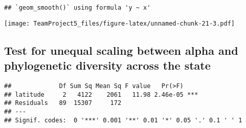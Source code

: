 \documentclass[
]{article}
\newenvironment{Shaded}{\begin{snugshade}}{\end{snugshade}}
\newcommand{\CommentTok}[1]{\textcolor[rgb]{0.56,0.35,0.01}{\textit{#1}}}
\newcommand{\DataTypeTok}[1]{\textcolor[rgb]{0.13,0.29,0.53}{#1}}
\newcommand{\KeywordTok}[1]{\textcolor[rgb]{0.13,0.29,0.53}{\textbf{#1}}}
\newcommand{\NormalTok}[1]{#1}
\newcommand{\OperatorTok}[1]{\textcolor[rgb]{0.81,0.36,0.00}{\textbf{#1}}}
\newcommand{\OtherTok}[1]{\textcolor[rgb]{0.56,0.35,0.01}{#1}}
\newcommand{\StringTok}[1]{\textcolor[rgb]{0.31,0.60,0.02}{#1}}
\begin{document}
\begin{verbatim}
## `geom_smooth()` using formula 'y ~ x'
\end{verbatim}

\texttt{[image: TeamProject5\_files/figure-latex/unnamed-chunk-21-3.pdf]}

\hypertarget{test-for-unequal-scaling-between-alpha-and-phylogenetic-diversity-across-the-state}{%
\subsection{Test for unequal scaling between alpha and phylogenetic
diversity across the
state}\label{test-for-unequal-scaling-between-alpha-and-phylogenetic-diversity-across-the-state}}

\begin{Shaded}
\end{Shaded}

\begin{verbatim}
##             Df Sum Sq Mean Sq F value   Pr(>F)    
## latitude     2   4122    2061   11.98 2.46e-05 ***
## Residuals   89  15307     172                     
## ---
## Signif. codes:  0 '***' 0.001 '**' 0.01 '*' 0.05 '.' 0.1 ' ' 1
\end{verbatim}
\end{document}
